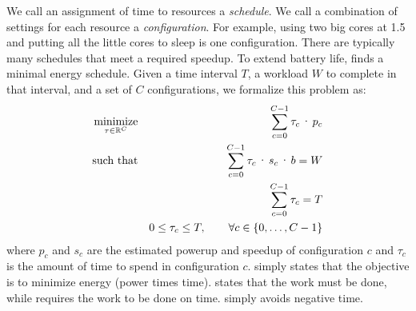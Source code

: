 We call an assignment of time to resources a \emph{schedule}. We call
a combination of settings for each resource a \emph{configuration}.
For example, using two big cores at 1.5 \GHz and putting all the
little cores to sleep is one configuration.  There are typically many
schedules that meet a required speedup.  To extend battery life,
\SYSTEM{} finds a minimal energy schedule. Given a time interval $T$,
a workload $W$ to complete in that interval, and a set of $C$
configurations, we formalize this problem as:
\begin{eqnarray}
  \minimize_{\tau \in \mathbb{R}^C} && \sum_{c=0}^{C-1} \tau_c \cdot p_c \label{eqn:power} \\
  \text{such that} %
  && \sum_{c=0}^{C-1} \tau_c \cdot s_c \cdot b =  W \label{eqn:work} \\
  && \sum_{c=0}^{C-1} \tau_c =  T \label{eqn:deadline} \\
  && 0 \le \tau_c \le T, \qquad \forall c \in \{0,\ldots,C-1\} \label{eqn:time}
\end{eqnarray}
where $p_c$ and $s_c$ are the estimated powerup and speedup of
configuration $c$ and $\tau_c$ is the amount of time to spend in
configuration $c$.   simply states that the objective is
to minimize energy (power times time).   states that the
work must be done, while  requires the work to be
done on time.   simply avoids negative time.


